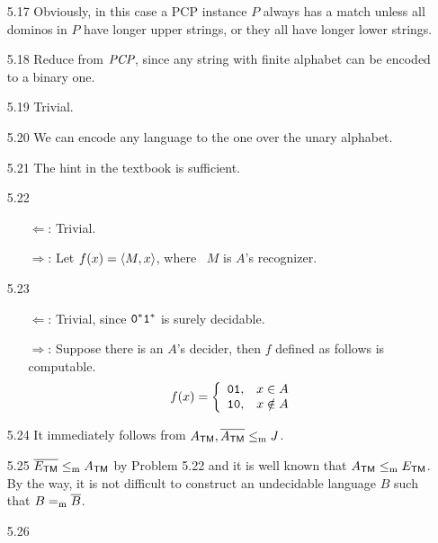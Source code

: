 \begin{itemize}
	\item[5.17]
	Obviously, in this case a PCP instance $P$ always has a match unless all dominos in $P$ have longer upper strings, or they all have longer lower strings.
	
	\item[5.18]
	Reduce from $\IT{PCP}$, since any string with finite alphabet can be encoded to a binary one.
	
	\item[5.19]
	Trivial.
	
	\item[5.20]
	We can encode any language to the one over the unary alphabet.
	
	\item[5.21]
	The hint in the textbook is sufficient.
	
	\item[5.22]
	\begin{itemize}
		\item[$\Leftarrow$:] Trivial.
		\item[$\Rightarrow$:] Let $f(x) = \Bra{M, x}$, where \TM\ $M$ is $A$'s recognizer. 
	\end{itemize}

	\item[5.23]
	\begin{itemize}
		\item[$\Leftarrow$:] Trivial, since $\TT{0}^*\TT{1}^*$ is surely decidable.
		\item[$\Rightarrow$:] Suppose there is an $A$'s decider, then $f$ defined as follows is computable.
		\[
			f(x) = 
			\left\{
				\begin{array}{ll}
					\TT{01}, & x \in A \\
					\TT{10}, & x \notin A
				\end{array}
			\right.
		\]
	\end{itemize}

	\item[5.24]
	It immediately follows from $A_{\TM}, \overline{A_{\TM}} \Leqm J$.
	
	\item[5.25]
	$\overline{E_{\TM}} \Leqm A_{\TM}$ by Problem 5.22 and it is well known that $A_{\TM} \Leqm E_{\TM}$. By the way, it is not difficult to construct an undecidable language $B$ such that $B =_{\RM{m}} \overline{B}$.
	
	\item[5.26]
	\Empty
	

\end{itemize}
